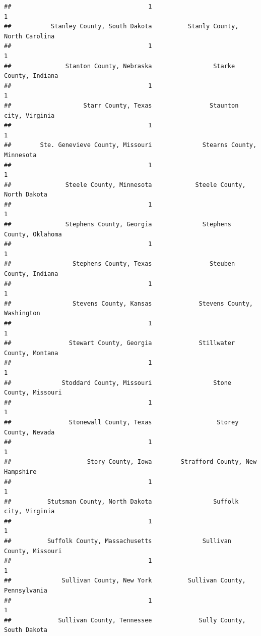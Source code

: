\documentclass[
]{article}
\begin{document}
\begin{verbatim}
##                                      1                                      1 
##           Stanley County, South Dakota          Stanly County, North Carolina 
##                                      1                                      1 
##               Stanton County, Nebraska                 Starke County, Indiana 
##                                      1                                      1 
##                    Starr County, Texas                Staunton city, Virginia 
##                                      1                                      1 
##        Ste. Genevieve County, Missouri              Stearns County, Minnesota 
##                                      1                                      1 
##               Steele County, Minnesota            Steele County, North Dakota 
##                                      1                                      1 
##               Stephens County, Georgia              Stephens County, Oklahoma 
##                                      1                                      1 
##                 Stephens County, Texas                Steuben County, Indiana 
##                                      1                                      1 
##                 Stevens County, Kansas             Stevens County, Washington 
##                                      1                                      1 
##                Stewart County, Georgia             Stillwater County, Montana 
##                                      1                                      1 
##              Stoddard County, Missouri                 Stone County, Missouri 
##                                      1                                      1 
##                Stonewall County, Texas                  Storey County, Nevada 
##                                      1                                      1 
##                     Story County, Iowa        Strafford County, New Hampshire 
##                                      1                                      1 
##          Stutsman County, North Dakota                 Suffolk city, Virginia 
##                                      1                                      1 
##          Suffolk County, Massachusetts              Sullivan County, Missouri 
##                                      1                                      1 
##              Sullivan County, New York          Sullivan County, Pennsylvania 
##                                      1                                      1 
##             Sullivan County, Tennessee             Sully County, South Dakota 

\end{verbatim}
\end{document}
